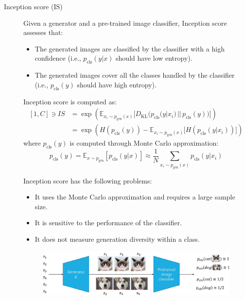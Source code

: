 \begin{description}
    \item[Inception score (IS)] 
        Given a generator and a pre-trained image classifier, Inception score assesses that:
        \begin{itemize}
            \item The generated images are classified by the classifier with a high confidence (i.e., $p_\text{cls}(y | x)$ should have low entropy).
            \item The generated images cover all the classes handled by the classifier (i.e., $p_\text{cls}(y)$ should have high entropy).
        \end{itemize}
        
        Inception score is computed as:
        \[ 
            \begin{split}
                [1, C] \ni IS &= \exp\left( \mathbb{E}_{x_i \sim p_\text{gen}(x)}\Big[ D_\text{KL}\big( p_\text{cls}(y | x_i) \,||\, p_\text{cls}(y) \big) \Big] \right) \\
                &= \exp\left( H(p_\text{cls}(y)) - \mathbb{E}_{x_i \sim p_\text{gen}(x)} \Big[ H(p_\text{cls}(y | x_i)) \Big] \right)
            \end{split}
        \]
        where $p_\text{cls}(y)$ is computed through Monte Carlo approximation:
        \[ 
            p_\text{cls}(y) = \mathbb{E}_{x \sim p_\text{gen}}\left[ p_\text{cls}(y | x) \right]
            \approx \frac{1}{N} \sum_{x_i \sim p_\text{gen}(x)} p_\text{cls}(y | x_i)
        \]

        \begin{remark}
            Inception score has the following problems:
            \begin{itemize}
                \item It uses the Monte Carlo approximation and requires a large sample size.
                \item It is sensitive to the performance of the classifier.
                \item It does not measure generation diversity within a class.
            \end{itemize}
        \end{remark}

        \begin{figure}[H]
            \centering
            \includegraphics[width=0.8\linewidth]{./img/_inception_score.jpg}
        \end{figure}
\end{description}


